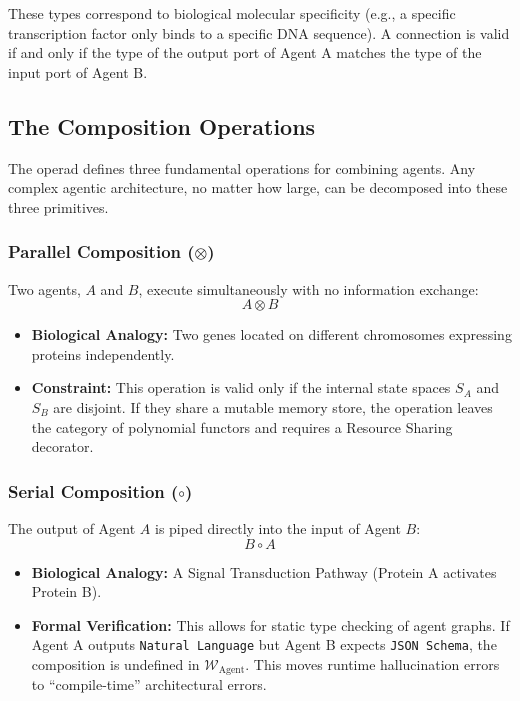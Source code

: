 \documentclass[11pt, a4paper]{article}
\newcommand{\Operad}{\mathcal{W}_{\text{Agent}}}
\begin{document}
These types correspond to biological molecular specificity (e.g., a specific transcription factor only binds to a specific DNA sequence). A connection is valid if and only if the type of the output port of Agent A matches the type of the input port of Agent B.

\subsection{The Composition Operations}
The operad defines three fundamental operations for combining agents. Any complex agentic architecture, no matter how large, can be decomposed into these three primitives.

\subsubsection{Parallel Composition ($\otimes$)}
Two agents, $A$ and $B$, execute simultaneously with no information exchange:
\begin{equation}
    A \otimes B
\end{equation}
\begin{itemize}
    \item \textbf{Biological Analogy:} Two genes located on different chromosomes expressing proteins independently.
    \item \textbf{Constraint:} This operation is valid only if the internal state spaces $S_A$ and $S_B$ are disjoint. If they share a mutable memory store, the operation leaves the category of polynomial functors and requires a Resource Sharing decorator.
\end{itemize}

\subsubsection{Serial Composition ($\circ$)}
The output of Agent $A$ is piped directly into the input of Agent $B$:
\begin{equation}
    B \circ A
\end{equation}
\begin{itemize}
    \item \textbf{Biological Analogy:} A Signal Transduction Pathway (Protein A activates Protein B).
    \item \textbf{Formal Verification:} This allows for static type checking of agent graphs. If Agent A outputs \texttt{Natural Language} but Agent B expects \texttt{JSON Schema}, the composition is undefined in $\Operad$. This moves runtime hallucination errors to ``compile-time'' architectural errors.
\end{itemize}
\end{document}

